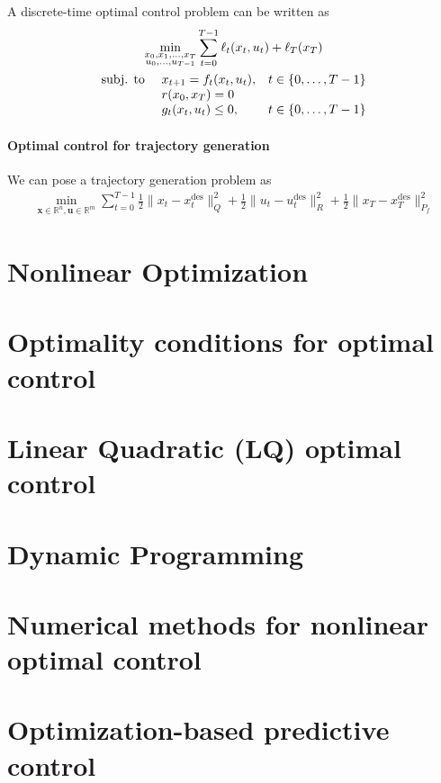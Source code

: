 \documentclass{book}
\DeclareMathOperator{\des}{des}
\newcommand{\R}{\mathbb{R}}
\begin{document}
A discrete-time optimal control problem can be written as 
\begin{gather*}
    \min_{\substack{x_0,x_1,\dots,x_T\\u_0,\dots,u_{T-1}}} \displaystyle\sum_{t=0}^{T-1}\ell_t(x_t,u_t)+\ell_T(x_T)\\
    \begin{array}{l l l}
        \text{subj. to } & x_{t+1}=f_t(x_t,u_t), & t\in\{0,\dots,T-1\}\\
                         & r(x_0,x_T) = 0 & \\
                         & g_t(x_t,u_t)\leq 0, & t\in\{0,\dots,T-1\}
    \end{array}
\end{gather*}

\subsubsection{Optimal control for trajectory generation}
We can pose a trajectory generation problem as 
\begin{gather*}
    \min_{\mathbf{x}\in\R^n,\mathbf{u}\in\R^m}\displaystyle\sum_{t=0}^{T-1}\displaystyle\frac{1}{2}\|x_t-x_t^{\des}\|^2_Q + \displaystyle\frac{1}{2}\|u_t-u_t^{\des}\|^2_R + \displaystyle\frac{1}{2}\|x_T-x_T^{\des}\|^2_{P_f}
\end{gather*}










\chapter{Nonlinear Optimization}




\chapter{Optimality conditions for optimal control}





\chapter{Linear Quadratic (LQ) optimal control}


\chapter{Dynamic Programming}



\chapter{Numerical methods for nonlinear optimal control}




\chapter{Optimization-based predictive control}
\end{document}
